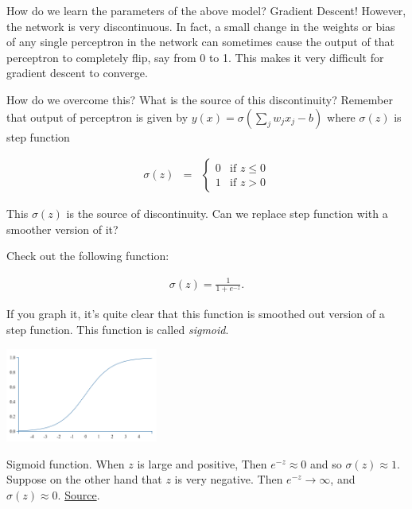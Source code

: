 \documentclass[a4paper]{tufte-handout}
\begin{document}
How do we learn the parameters of the above model? Gradient Descent!
However, the network is very discontinuous. In fact, a small change in
the weights or bias of any single perceptron in the network can
sometimes cause the output of that perceptron to completely flip, say
from 0 to 1. This makes it very difficult for gradient descent to
converge.

How do we overcome this? What is the source of this discontinuity?
Remember that output of perceptron is given by
\(y(x) = \sigma\left(\sum_j w_j x_j - b\right)\) where \(\sigma(z)\) is
step function

\begin{eqnarray*}
  \sigma(z) & = & \left\{ \begin{array}{ll}
      0 & \mbox{if } z \leq 0 \\
      1 & \mbox{if } z > 0
      \end{array} \right.
\end{eqnarray*}

This \(\sigma(z)\) is the source of discontinuity. Can we replace
step function with a smoother version of it?

Check out the following function:

\begin{eqnarray*} 
  \sigma(z) = \frac{1}{1+e^{-z}}.
\end{eqnarray*}

If you graph it, it's quite clear that this function is smoothed out
version of a step function. This function is called \emph{sigmoid}.

\begin{marginfigure}
  \includegraphics[width=50mm]{sigmoid}
  \caption{Sigmoid function. When \(z\) is large and
  positive, Then \(e^{-z} \approx 0\) and so \(\sigma(z) \approx 1\).
  Suppose on the other hand that \(z\) is very negative. Then
  \(e^{-z} \rightarrow \infty\), and \(\sigma(z) \approx 0\).
  \href{http://neuralnetworksanddeeplearning.com/chap1.html}{Source}.}
\end{marginfigure}
\end{document}
